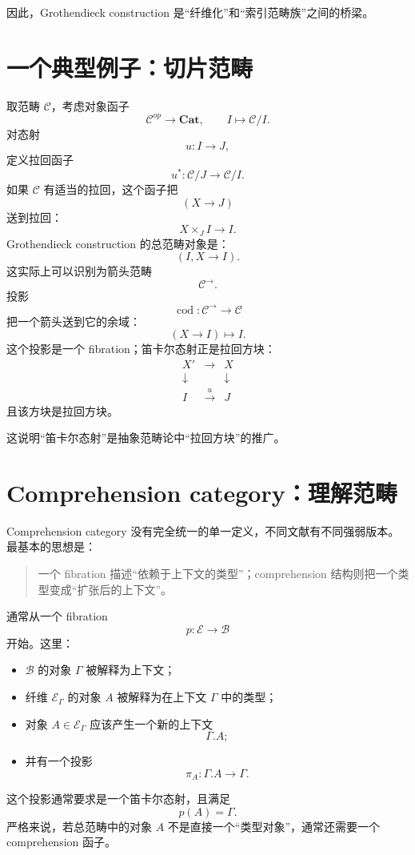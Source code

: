 \documentclass[12pt,a4paper]{article}
\begin{document}
因此，Grothendieck construction 是“纤维化”和“索引范畴族”之间的桥梁。

\section{一个典型例子：切片范畴}

取范畴 \(\mathcal{C}\)，考虑对象函子
\[
\mathcal{C}^{op}\to\mathbf{Cat},
\qquad
I\longmapsto \mathcal{C}/I.
\]
对态射
\[
u:I\to J,
\]
定义拉回函子
\[
u^*:\mathcal{C}/J\to\mathcal{C}/I.
\]
如果 \(\mathcal{C}\) 有适当的拉回，这个函子把
\[
(X\to J)
\]
送到拉回：
\[
X\times_J I\to I.
\]
Grothendieck construction 的总范畴对象是：
\[
(I,X\to I).
\]
这实际上可以识别为箭头范畴
\[
\mathcal{C}^{\to}.
\]
投影
\[
\operatorname{cod}:\mathcal{C}^{\to}\to\mathcal{C}
\]
把一个箭头送到它的余域：
\[
(X\to I)\longmapsto I.
\]
这个投影是一个 fibration；笛卡尔态射正是拉回方块：
\[
\begin{array}{ccc}
X' &\to& X\\
\downarrow &&\downarrow\\
I&\xrightarrow{u}&J
\end{array}
\]
且该方块是拉回方块。

这说明“笛卡尔态射”是抽象范畴论中“拉回方块”的推广。

\section{Comprehension category：理解范畴}

Comprehension category 没有完全统一的单一定义，不同文献有不同强弱版本。最基本的思想是：
\begin{quote}
一个 fibration 描述“依赖于上下文的类型”；comprehension 结构则把一个类型变成“扩张后的上下文”。
\end{quote}

通常从一个 fibration
\[
p:\mathcal{E}\to\mathcal{B}
\]
开始。这里：
\begin{itemize}
  \item \(\mathcal{B}\) 的对象 \(\Gamma\) 被解释为上下文；
  \item 纤维 \(\mathcal{E}_\Gamma\) 的对象 \(A\) 被解释为在上下文 \(\Gamma\) 中的类型；
  \item 对象 \(A\in\mathcal{E}_\Gamma\) 应该产生一个新的上下文
  \[
  \Gamma.A;
  \]
  \item 并有一个投影
  \[
  \pi_A:\Gamma.A\to\Gamma.
  \]
\end{itemize}
这个投影通常要求是一个笛卡尔态射，且满足
\[
p(A)=\Gamma.
\]
严格来说，若总范畴中的对象 \(A\) 不是直接一个“类型对象”，通常还需要一个 comprehension 函子。
\end{document}
